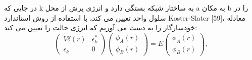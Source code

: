 در جایی که k به ساختار شبکه بستگی دارد و انرژی پرش از محل a به مکان b را در سلول واحد تعیین می کند، با استفاده از روش استاندارد Koster-Slater [59]، معادله خودسازگار را به دست می آوریم که انرژی حالت را تعیین می کند:
\begin{equation}
  \left(
  \begin{array}{cc}
    V\delta(r)&\epsilon^{*}_{k}\\
    \epsilon_k & 0
  \end{array}
  \right)
  \left(
  \begin{array}{c}
    \phi_{A}(r)\\
    \phi_{B}(r)
  \end{array}
  \right)
  =E
  \left(
  \begin{array}{c}
    \phi_{A}(r)\\
    \phi_{B}(r)
  \end{array}
  \right),
\end{equation}



